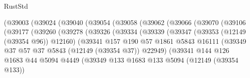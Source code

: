 \begin{lexlean}{RustStd}
\begin{coremodule}
                        (@39003
                          (@39024
                            (@39040
                              (@39054
                                (@39058
                                  (@39062
                                    (@39066
                                      (@39070
                                        (@39106
                                          (@39177
                                            (@39260
                                              (@39278
                                                (@39326
                                                  (@39334
                                                    (@39339
                                                      (@39347
                                                        (@39353 (@12149 (@39354 @96)) @12160)
                                                        (@39341
                                                          @157
                                                          @190
                                                          @57
                                                          @1861
                                                          @5843
                                                          @16111
                                                          (@39349
                                                            @37
                                                            @57
                                                            @37
                                                            @5843
                                                            (@12149 (@39354 @37))
                                                            @22949)
                                                          (@39341
                                                            @144
                                                            @126
                                                            @1683
                                                            @44
                                                            @5094
                                                            @4449
                                                            (@39349
                                                              @133
                                                              @1683
                                                              @133
                                                              @5094
                                                              (@12149 (@39354 @133))

\end{coremodule}
\end{lexlean}
